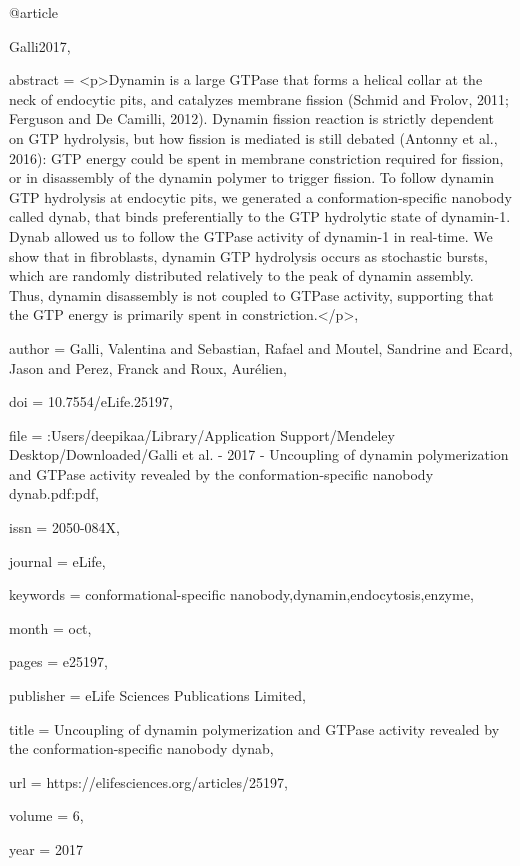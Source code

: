 @article{Galli2017,

abstract = {{\textless}p{\textgreater}Dynamin is a large GTPase that forms a helical collar at the neck of endocytic pits, and catalyzes membrane fission (Schmid and Frolov, 2011; Ferguson and De Camilli, 2012). Dynamin fission reaction is strictly dependent on GTP hydrolysis, but how fission is mediated is still debated (Antonny et al., 2016): GTP energy could be spent in membrane constriction required for fission, or in disassembly of the dynamin polymer to trigger fission. To follow dynamin GTP hydrolysis at endocytic pits, we generated a conformation-specific nanobody called dynab, that binds preferentially to the GTP hydrolytic state of dynamin-1. Dynab allowed us to follow the GTPase activity of dynamin-1 in real-time. We show that in fibroblasts, dynamin GTP hydrolysis occurs as stochastic bursts, which are randomly distributed relatively to the peak of dynamin assembly. Thus, dynamin disassembly is not coupled to GTPase activity, supporting that the GTP energy is primarily spent in constriction.{\textless}/p{\textgreater}},

author = {Galli, Valentina and Sebastian, Rafael and Moutel, Sandrine and Ecard, Jason and Perez, Franck and Roux, Aur{\'{e}}lien},

doi = {10.7554/eLife.25197},

file = {:Users/deepikaa/Library/Application Support/Mendeley Desktop/Downloaded/Galli et al. - 2017 - Uncoupling of dynamin polymerization and GTPase activity revealed by the conformation-specific nanobody dynab.pdf:pdf},

issn = {2050-084X},

journal = {eLife},

keywords = {conformational-specific nanobody,dynamin,endocytosis,enzyme},

month = {oct},

pages = {e25197},

publisher = {eLife Sciences Publications Limited},

title = {{Uncoupling of dynamin polymerization and GTPase activity revealed by the conformation-specific nanobody dynab}},

url = {https://elifesciences.org/articles/25197},

volume = {6},

year = {2017}

}

